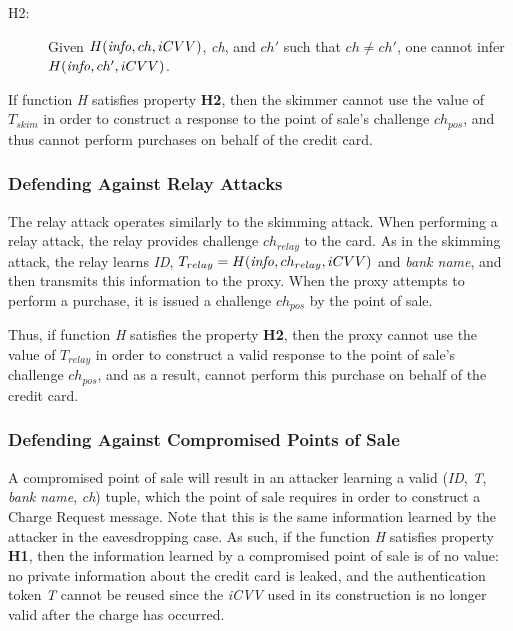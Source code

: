 \begin{description}
\item[H2:] Given $H(\textrm{\emph{info}}, ch, iCVV)$, \emph{ch}, and $ch'$ such that $ch \neq ch'$, one cannot infer $H(\textrm{\emph{info}}, ch', iCVV)$.
\end{description}

If function \emph{H} satisfies property \textbf{H2}, then the skimmer cannot use the value of $T_{skim}$ in order to construct a response to the point of sale's challenge $ch_{pos}$, and thus cannot perform purchases on behalf of the credit card.






\subsubsection*{Defending Against Relay Attacks}
The relay attack operates similarly to the skimming attack.
When performing a relay attack, the relay provides challenge $ch_{relay}$ to the card.
As in the skimming attack, the relay learns \emph{ID}, $T_{relay} = H(\textrm{\emph{info}}, ch_{relay}, iCVV)$ and \emph{bank name}, and then transmits this information to the proxy.
When the proxy attempts to perform a purchase, it is issued a challenge $ch_{pos}$ by the point of sale.

Thus, if function \emph{H} satisfies the property \textbf{H2},
	then the proxy cannot use the value of $T_{relay}$ in order to construct a valid response to the point of sale's challenge $ch_{pos}$,
	and as a result, cannot perform this purchase on behalf of the credit card.






\subsubsection*{Defending Against Compromised Points of Sale}
A compromised point of sale will result in an attacker learning a valid (\emph{ID}, \emph{T}, \emph{bank name}, \emph{ch}) tuple,
	which the point of sale requires in order to construct a Charge Request message.
Note that this is the same information learned by the attacker in the eavesdropping case.
As such, if the function \emph{H} satisfies property \textbf{H1}, then the information learned by a compromised point of sale is of no value:
	no private information about the credit card is leaked,
	and the authentication token \emph{T} cannot be reused since the \emph{iCVV} used in its construction is no longer valid after the charge has occurred.



